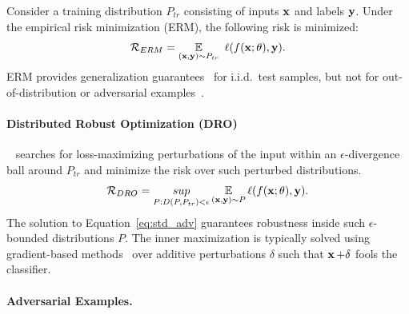 Consider a training distribution $P_{tr}$ consisting of inputs $\operatorname{\mathbf{x}}$ and labels $\operatorname{\mathbf{y}}$.
Under the empirical risk minimization (ERM), the following risk is minimized:
\begin{equation}
    \mathcal{R}_{ERM} = \operatorname*{\mathbb{E}}_{(\operatorname{\mathbf{x}}, \operatorname{\mathbf{y}}) \sim P_{tr}}  ~\ell(f(\operatorname{\mathbf{x}}; \theta), \operatorname{\mathbf{y}}).
    \label{eq:erm}
\end{equation}
ERM provides generalization guarantees~\citep{vapnik1991principles} for i.i.d.\ test samples, but not for out-of-distribution or adversarial examples~\citep{biggio2013evasion,szegedy2014intriguing}. 

\paragraph{Distributed Robust Optimization (DRO)}~\citep{pmlr-v80-hu18a,sagawa2020distributionally} searches for loss-maximizing perturbations of the input within an $\epsilon$-divergence ball around $P_{tr}$ and minimize the risk over such perturbed distributions.
\begin{equation}
    \mathcal{R}_{DRO}=\underset{P:D(P, P_{tr})<\epsilon}{sup}\operatorname*{\mathbb{E}}_{(\operatorname{\mathbf{x}}, \operatorname{\mathbf{y}}) \sim P} \ell(f(\operatorname{\mathbf{x}}; \theta), \operatorname{\mathbf{y}}).
    \label{eq:std_adv}
\end{equation}
The solution to Equation~\ref{eq:std_adv} guarantees robustness inside such $\epsilon$-bounded distributions $P$.
The inner maximization is typically solved using gradient-based methods~\citep{madry2018towards} over additive perturbations $\delta$ such that $\operatorname{\mathbf{x}}+\delta$ fools the classifier.

\paragraph{Adversarial Examples.}



